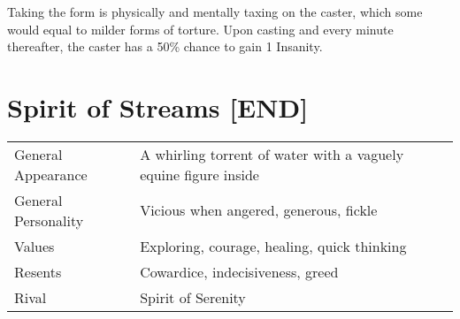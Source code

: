 \documentclass[11pt,a4paper,twocolumn]{book}
\begin{document}
Taking the form is physically and mentally taxing on the caster, which some would equal to milder forms of torture. Upon casting and every minute thereafter, the caster has a 50\% chance to gain 1 Insanity.

%	
%
%
%

\section*{Spirit of Streams [END]}
{
	\begin{tabu} to 75mm{| X[l,4] | X[l,8] |}
		\hline
		General Appearance  & A whirling torrent of water with a vaguely equine figure inside \\
		General Personality & Vicious when angered, generous, fickle                          \\
		Values              & Exploring, courage, healing, quick thinking                     \\
		Resents             & Cowardice, indecisiveness, greed                                \\
		Rival               & Spirit of Serenity                                              \\ \hline
	\end{tabu}
	
}
\end{document}
